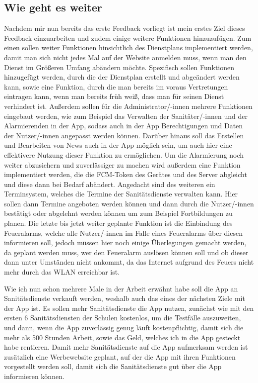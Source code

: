 \subsection{Wie geht es weiter}
Nachdem mir nun bereits das erste Feedback vorliegt ist mein erstes Ziel dieses Feedback einzuarbeiten und zudem einige weitere Funktionen
hinzuzufügen. Zum einen sollen weiter Funktionen hinsichtlich des Dienstplans implementiert werden, damit man sich nicht jedes Mal auf der
Website anmelden muss, wenn man den Dienst im Größeren Umfang abändern möchte. Spezifisch sollen Funktionen hinzugefügt werden, durch die 
der Dienstplan erstellt und abgeändert werden kann, sowie eine Funktion, durch die man bereits im voraus Vertretungen eintragen kann, wenn man 
bereits früh weiß, dass man für seinen Dienst verhindert ist. Außerdem sollen für die Administrator/-innen mehrere Funktionen eingebaut werden, 
wie zum Beispiel das Verwalten der Sanitäter/-innen und der Alarmierenden in der App, sodass auch in der App Berechtigungen und Daten der 
Nutzer/-innen angepasst werden können. Darüber hinaus soll das Erstellen und Bearbeiten von News auch in der App möglich sein, um auch hier
eine effektivere Nutzung dieser Funktion zu ermöglichen. Um die Alarmierung noch weiter abzusichern und zuverlässiger zu machen wird außerdem eine
Funktion implementiert werden, die die FCM-Token des Gerätes und des Server abgleicht und diese dann bei Bedarf abändert.
Angedacht sind des weiteren ein Terminsystem, welches die Termine der Sanitätsdienste verwalten kann. Hier sollen dann Termine angeboten werden 
können und dann durch die Nutzer/-innen bestätigt oder abgelehnt werden können um zum Beispiel Fortbildungen zu planen.
Die letzte bis jetzt weiter geplante Funktion ist die Einbindung des Feueralarms, welche alle Nutzer/-innen im Falle eines Feueralarms
über diesen informieren soll, jedoch müssen hier noch einige Überlegungen gemacht werden, da geplant werden muss, wer den Feueralarm
auslösen können soll und ob dieser dann unter Umständen nicht ankommt, da das Internet aufgrund des Feuers nicht mehr durch das WLAN erreichbar ist.

Wie ich nun schon mehrere Male in der Arbeit erwähnt habe soll die App an Sanitätsdienste verkauft werden, weshalb auch das eines der nächsten 
Ziele mit der App ist. Es sollen mehr Sanitätsdienste die App nutzen, zunächst wie mit den ersten 6 Sanitätsdiensten der Schulen kostenlos,
um die Testfälle auszuweiten, und dann, wenn die App zuverlässig genug läuft kostenpflichtig, damit sich die mehr als 500 Stunden Arbeit, sowie 
das Geld, welches ich in die App gesteckt habe rentieren. Damit mehr Sanitätsdienste auf die App aufmerksam werden ist zusätzlich eine Werbewebsite
geplant, auf der die App mit ihren Funktionen vorgestellt werden soll, damit sich die Sanitätsdienste gut über die App informieren können.


